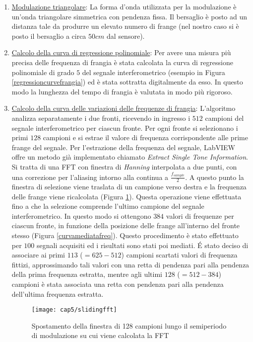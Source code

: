 \begin{enumerate}
	\item \underline{Modulazione triangolare}: La forma d'onda utilizzata per la modulazione è un'onda triangolare simmetrica con pendenza fissa. Il bersaglio è posto ad un distanza tale da produrre un elevato numero di frange (nel nostro caso si è posto il bersaglio a circa $50cm$ dal sensore).
	\item \underline{Calcolo della curva di regressione polinomiale}: Per avere una misura più precisa delle frequenza di frangia è stata calcolata la curva di regressione polinomiale di grado $5$ del segnale interferometrico (esempio in Figura \ref{regressioncurvefrangia}) ed è stata sottratta digitalmente da esso. In questo modo la lunghezza del tempo di frangia è valutata in modo più rigoroso.
	
	\item \underline{Calcolo della curva delle variazioni delle frequenze di frangia}: L'algoritmo analizza separatamente i due fronti, ricevendo in ingresso i $512$ campioni del segnale interferometrico per ciascun fronte. Per ogni fronte si selezionano i primi $128$ campioni e si estrae il valore di frequenza corrispondente alle prime frange del segnale. Per l'estrazione della frequenza del segnale, LabVIEW offre un metodo già implementato chiamato \textit{Extract Single Tone Information}. Si tratta di una FFT con finestra di \textit{Hanning} interpolata a due punti, con una correzione per l'aliasing intorno alla continua a $\frac{f_{sample}}{2}$. A questo punto la finestra di selezione viene traslata di un campione verso destra e la frequenza delle frange viene ricalcolata (Figura \ref{slidingfft}). Questa operazione viene effettuata fino a che la selezione comprende l'ultimo campione del segnale interferometrico.
	In questo modo si ottengono $384$ valori di frequenze per ciascun fronte, in funzione della posizione delle frange all'interno del fronte stesso (Figura \ref{curvamediatafreq}). Questo procedimento è stato effettuato per $100$ segnali acquisiti ed i risultati sono stati poi mediati. \'E stato deciso di associare ai primi $113$ ($=625-512$) campioni scartati valori di frequenza fittizi, approssimando tali valori con una retta di pendenza pari alla pendenza della prima frequenza estratta, mentre agli ultimi $128$ ($=512-384$) campioni è stata associata una retta con pendenza pari alla pendenza dell'ultima frequenza estratta.
		\begin{figure}[H]  
			\begin{center}
				\texttt{[image: cap5/slidingfft]}
				\caption{Spostamento della finestra di 128 campioni lungo il semiperiodo di modulazione su cui viene calcolata la FFT}
				\label{slidingfft}
			\end{center}
		\end{figure}
		

\end{enumerate}

